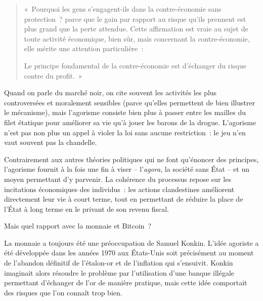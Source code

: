 \begin{quote}
«~Pourquoi les gens s'engagent-ils dans la contre-économie sans protection~? parce que le gain par rapport au risque qu'ils prennent est plus grand que la perte attendue. Cette affirmation est vraie au sujet de toute activité économique, bien sûr, mais concernant la contre-économie, elle mérite une attention particulière~:

Le principe fondamental de la contre-économie est d'échanger du risque contre du profit.~»
\end{quote}


Quand on parle du marché noir, on cite souvent les activités les plus controversées et moralement sensibles (parce qu'elles permettent de bien illustrer le mécanisme), mais l'agorisme consiste bien plus à passer entre les mailles du filet étatique pour améliorer sa vie qu'à jouer les barons de la drogue. L'agorisme n'est pas non plus un appel à violer la loi sans aucune restriction~: le jeu n'en vaut souvent pas la chandelle. 

Contrairement aux autres théories politiques qui ne font qu'énoncer des principes, l'agorisme fournit à la fois une fin à viser -- l'\emph{agora}, la société sans État -- et un moyen permettant d'y parvenir. La cohérence du processus repose sur les incitations économiques des individus~: les actions clandestines améliorent directement leur vie à court terme, tout en permettant de réduire la place de l'État à long terme en le privant de son revenu fiscal.


Mais quel rapport avec la monnaie et Bitcoin~?

La monnaie a toujours été une préoccupation de Samuel Konkin. L'idée agoriste a été développée dans les années 1970 aux États-Unis soit précisément au moment de l'abandon définitif de l'étalon-or et de l'inflation qui s'ensuivit. Konkin imaginait alors résoudre le problème par l'utilisation d'une banque illégale permettant d'échanger de l'or de manière pratique, mais cette idée comportait des risques que l'on connaît trop bien.

